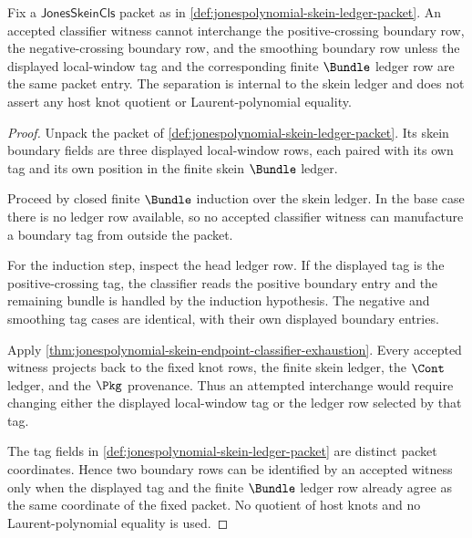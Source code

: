 \begin{theorem}
\label{thm:jonespolynomial-skein-boundary-no-confusion}
Fix a $\mathsf{JonesSkeinCls}$ packet as in
\autoref{def:jonespolynomial-skein-ledger-packet}. An accepted classifier
witness cannot interchange the positive-crossing boundary row, the
negative-crossing boundary row, and the smoothing boundary row unless the
displayed local-window tag and the corresponding finite $\Bundle$ ledger row
are the same packet entry. The separation is internal to the skein ledger and
does not assert any host knot quotient or Laurent-polynomial equality.
\end{theorem}
\begin{proof}
Unpack the packet of
\autoref{def:jonespolynomial-skein-ledger-packet}. Its skein boundary fields
are three displayed local-window rows, each paired with its own tag and its own
position in the finite skein $\Bundle$ ledger.

Proceed by closed finite $\Bundle$ induction over the skein ledger. In the base
case there is no ledger row available, so no accepted classifier witness can
manufacture a boundary tag from outside the packet.

For the induction step, inspect the head ledger row. If the displayed tag is
the positive-crossing tag, the classifier reads the positive boundary entry and
the remaining bundle is handled by the induction hypothesis. The negative and
smoothing tag cases are identical, with their own displayed boundary entries.

Apply
\autoref{thm:jonespolynomial-skein-endpoint-classifier-exhaustion}. Every
accepted witness projects back to the fixed knot rows, the finite skein ledger,
the $\Cont$ ledger, and the $\Pkg$ provenance. Thus an attempted interchange
would require changing either the displayed local-window tag or the ledger row
selected by that tag.

The tag fields in
\autoref{def:jonespolynomial-skein-ledger-packet} are distinct packet
coordinates. Hence two boundary rows can be identified by an accepted witness
only when the displayed tag and the finite $\Bundle$ ledger row already agree
as the same coordinate of the fixed packet. No quotient of host knots and no
Laurent-polynomial equality is used.
\end{proof}

